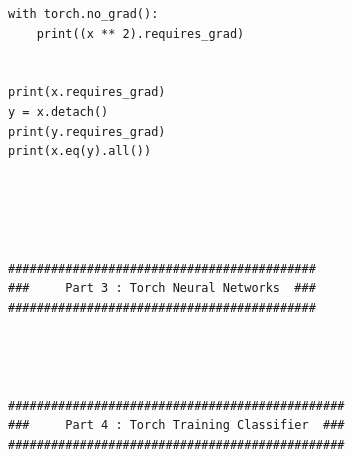 \documentclass[a4paper,11pt]{article}
\theoremstyle{mytheor}
\begin{document}
\begin{lstlisting}[label={list:first},caption=Sample Python code --PyTorch 60m blizt.]
with torch.no_grad():
    print((x ** 2).requires_grad)


print(x.requires_grad)
y = x.detach()
print(y.requires_grad)
print(x.eq(y).all())





###########################################
###     Part 3 : Torch Neural Networks  ###
###########################################




###############################################
###     Part 4 : Torch Training Classifier  ###
###############################################
\end{lstlisting}
\end{document}
